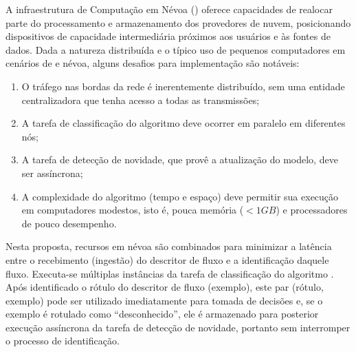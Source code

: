 A infraestrutura de Computação em Névoa (\fog) oferece capacidades de realocar
parte do processamento e armazenamento dos provedores de nuvem, posicionando
dispositivos de capacidade intermediária próximos aos usuários e às fontes de dados.
Dada a natureza distribuída e o típico uso de pequenos computadores em cenários
de \iot e névoa, alguns desafios para implementação \nids são notáveis:
\begin{enumerate}[label=(\emph{\roman*})]

  \item O tráfego nas bordas da rede é inerentemente distribuído, sem uma
  entidade centralizadora que tenha acesso a todas as transmissões;
  
  \item A tarefa de classificação do algoritmo deve ocorrer em paralelo em
  diferentes nós;
  
  \item A tarefa de detecção de novidade, que provê a atualização do modelo,
  deve ser assíncrona;
    
  \item A complexidade do algoritmo (tempo e espaço) deve permitir sua execução em
  computadores modestos, isto é, pouca memória ($< 1GB$) e processadores de
  pouco desempenho.

\end{enumerate}

Nesta proposta, recursos em névoa são combinados para minimizar a latência entre
o recebimento (ingestão) do descritor de fluxo e a identificação daquele fluxo.
Executa-se múltiplas instâncias da tarefa de classificação do algoritmo \minas.
Após identificado o rótulo do descritor de fluxo (exemplo), este par (rótulo, exemplo) pode ser
utilizado imediatamente para tomada de decisões e, se o exemplo é rotulado como
``desconhecido'', ele é armazenado para posterior execução assíncrona da tarefa
de detecção de novidade, portanto sem interromper o processo de identificação.

